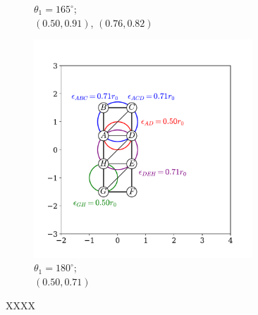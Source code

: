 \begin{figure}[tb]
\begin{subfigure}[b]{0.32\textwidth}
         \caption{$\theta_1=165^\circ$; \\$\left(0.50,0.91\right)$, $\left(0.76,0.82\right)$ }
         \label{fig:sloct}
     \end{subfigure}
      \hfill
     \begin{subfigure}[b]{0.32\textwidth}
         \centering
         \includegraphics[width=0.9\textwidth]{./figures/ph/sl_oct_b3_180.pdf}
         \caption{$\theta_1=180^\circ$; \\$\left(0.50,0.71\right)$}
         \label{fig:sloct}
     \end{subfigure}
   
   
	\caption{XXXX}
	\label{fig:}
\end{figure}



